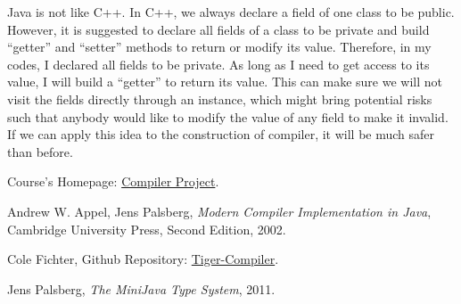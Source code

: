 \documentclass[letterpaper, 14pt]{article}
\begin{document}
Java is not like C++. In C++, we always declare a field of one class to be public. However, 
it is suggested to declare all fields of a class to be private and build ``getter'' and 
``setter'' methods to return or modify its value. Therefore, in my codes, I declared all fields
to be private. As long as I need to get access to its value, I will build a ``getter'' to return 
its value. This can make sure we will not visit the fields directly through an instance, which might 
bring potential risks such that anybody would like to modify the value of any field to make it invalid. 
If we can apply this idea to the construction of compiler, it will be much safer than before. 

\begin{thebibliography}{9}

	Course's Homepage: 
	\href{https://www.cs.ucr.edu/~lesani/teaching/cp/cp.html}{Compiler Project}. 

	Andrew W. Appel, Jens Palsberg, 
	\textit{Modern Compiler Implementation in Java},
	Cambridge University Press, 
	Second Edition, 
	2002. 

	Cole Fichter, 
	Github Repository: \href{https://github.com/colefichter/Tiger-Compiler}{Tiger-Compiler}. 
	
	Jens Palsberg, 
	\textit{The MiniJava Type System}, 
	2011. 

\end{thebibliography}
\end{document}
